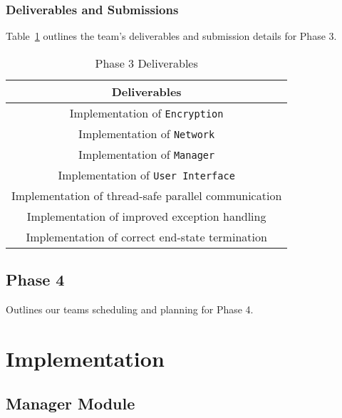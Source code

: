 \documentclass[sigconf]{acmart}
\begin{document}
\subsubsection{Deliverables and Submissions}
Table~\ref{Phase 3 Deliverables} outlines the team's deliverables and submission details for Phase
3.
\begin{table}[htb]
	\centering
	\caption{Phase 3 Deliverables}
	\label{Phase 3 Deliverables}

	\begin{tabular}{|c|} \hline
		\textbf{Deliverables}                                \\ \hline
		Implementation of \texttt{Encryption}                \\ \hline
		Implementation of \texttt{Network}                   \\ \hline
		Implementation of \texttt{Manager}                   \\ \hline
		Implementation of \texttt{User Interface}            \\ \hline
		Implementation of thread-safe parallel communication \\ \hline
		Implementation of improved exception handling        \\ \hline
		Implementation of correct end-state termination      \\ \hline
	\end{tabular}
\end{table}


\subsection{Phase 4}
Outlines our teams scheduling and planning for Phase 4.
%


\section{Implementation}

\subsection{Manager Module}
\end{document}
